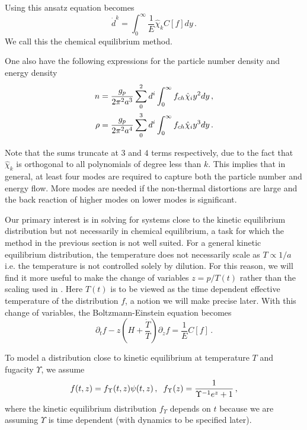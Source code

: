 Using this ansatz  equation  becomes
\begin{equation}\label{eq:ChemEquilibMethod}
\dot{d}^k=\int_0^\infty\frac{1}{E}\hat{\chi}_k C[f]dy\,.
\end{equation}
We call this the chemical equilibrium method.

One also have the following expressions for the particle number density and energy density
\begin{align}\label{free_stream_moments}
n&=\frac{g_p}{2\pi^2 a^3}\sum_0^2 d^i\int_0^\infty f_{ch}\hat\chi_i y^2dy\,,\\
\rho&=\frac{g_p}{2\pi^2a^4}\sum_0^3 d^i\int_0^\infty f_{ch}\hat\chi_i y^3dy\,.\notag
\end{align}

Note that the sums truncate at $3$ and $4$ terms respectively, due to the fact that $\hat\chi_k$ is orthogonal to all polynomials of degree less than $k$. This implies that in general, at least four modes are required to capture both the particle number and energy flow. More modes are needed if the non-thermal distortions are large and the back reaction of higher modes on lower modes is significant.

\label{kinetic_eq_approach}
Our primary interest is in solving  for systems close to the kinetic equilibrium distribution  but not necessarily in chemical equilibrium, a task for which the method in the previous section is not well suited. For a general kinetic equilibrium distribution, the temperature does not necessarily scale as $T\propto 1/a$ i.e. the temperature is not controlled solely by dilution.  For this reason, we will find it more useful to make the change of variables $z=p/T(t)$ rather than the scaling used in .  Here $T(t)$ is to be viewed as the time dependent effective temperature of the distribution $f$, a notion we will make precise later.  With this change of variables, the Boltzmann-Einstein equation becomes
\begin{equation}\label{T_boltzmann}
\partial_t f-z\left(H+\frac{\dot T}{T}\right)\partial_z f=\frac{1}{E}C[f]\,.
\end{equation}


To model a distribution close to kinetic equilibrium at temperature $T$ and fugacity $\Upsilon$, we assume
\begin{equation}\label{kinetic_approx}
f(t,z)= f_\Upsilon (t,z)\psi(t,z)\,,\hspace{2mm} f_\Upsilon(z)=\frac{1}{\Upsilon^{-1}e^z+1}\,,
\end{equation}
where the kinetic equilibrium distribution $f_\Upsilon $ depends on $t$ because we are assuming $\Upsilon$ is time dependent (with dynamics to be specified later). 

